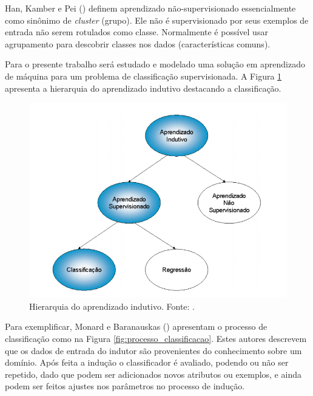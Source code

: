 Han, Kamber e Pei (\citeyear{Han:2011:DMC:1972541}) definem aprendizado não-supervisionado essencialmente como sinônimo de \textit{cluster} (grupo). Ele não é supervisionado por seus exemplos de entrada não serem rotulados como classe. Normalmente é possível usar agrupamento para descobrir classes nos dados (características comuns).

Para o presente trabalho será estudado e modelado uma solução em aprendizado de máquina para um problema de classificação supervisionada. A Figura \ref{fig:hierarquia_aprendizado} apresenta a hierarquia do aprendizado indutivo destacando a classificação.

\begin{figure}[H]
    \centering
    \includegraphics[scale=0.45]{figuras/referencial_teorico/hierarquia_aprendizado.png}
    \caption[Hierarquia do aprendizado indutivo]{Hierarquia do aprendizado indutivo. Fonte: \cite{Monard:2003}.}
    \label{fig:hierarquia_aprendizado}
\end{figure}

Para exemplificar, Monard e Baranauskas (\citeyear{Monard:2003}) apresentam o processo de classificação como na Figura \ref{fig:processo_classificacao}. Estes autores descrevem que os dados de entrada do indutor são provenientes do conhecimento sobre um domínio. Após feita a indução o classificador é avaliado, podendo ou não ser repetido, dado que podem ser adicionados novos atributos ou exemplos, e ainda podem ser feitos ajustes nos parâmetros no processo de indução.

